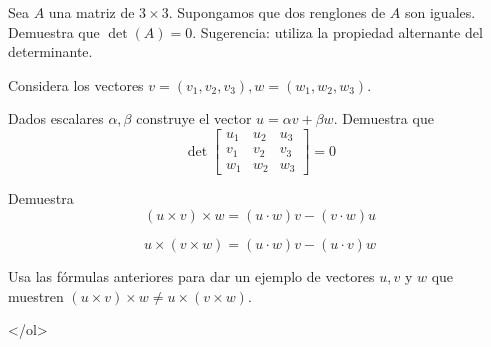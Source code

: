\documentclass{article}
\theoremstyle{definition}
\begin{document}
\item\label{Ejer:DeterRenglonesRepetidos} Sea $A$ una matriz de $3 \times 3$. Supongamos que dos renglones de $A$ son iguales. Demuestra
que $\det(A)=0$. Sugerencia: utiliza la propiedad alternante del determinante.

\item Considera los vectores $v=(v_1,v_2,v_3), w=(w_1,w_2,w_3)$. 

Dados escalares $\alpha, \beta$ construye
el vector $u=\alpha v+ \beta w$. Demuestra que 
$$
\det\left[
\begin{array}{ccc}
u_1 & u_2 & u_3 \\
v_1 & v_2 & v_3 \\
w_1 & w_2 & w_3
\end{array}
\right]=0
$$


\item Demuestra 
	$$
	(u\times v) \times w= (u \cdot w) v - (v \cdot w ) u
	$$
	
	$$
	u\times (v\times w)=   (u \cdot w )v -(u \cdot v ) w	
	$$

	Usa las fórmulas anteriores para dar un ejemplo de vectores $u,v$ y $w$ que muestren 
	$(u\times v) \times w\ne u \times (v \times w) $.
	
	</ol>





  
       
\end{document}

